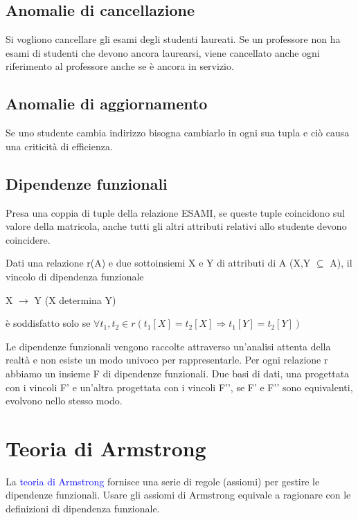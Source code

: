 \subsection{Anomalie di cancellazione}

Si vogliono cancellare gli esami degli studenti laureati. Se un professore non ha esami di studenti che devono ancora laurearsi, viene cancellato anche ogni riferimento al professore anche se è ancora in servizio.

\subsection{Anomalie di aggiornamento}

Se uno studente cambia indirizzo bisogna cambiarlo in ogni sua tupla e ciò causa una criticità di efficienza.

\subsection{Dipendenze funzionali}

Presa una coppia di tuple della relazione ESAMI, se queste tuple coincidono sul valore della matricola, anche tutti gli altri attributi relativi allo studente devono coincidere.

Dati una relazione r(A) e due sottoinsiemi X e Y di attributi di A (X,Y $\subseteq$ A), il vincolo di dipendenza funzionale

\begin{center}
    X $\rightarrow$ Y (X determina Y)
\end{center}

è soddisfatto solo se $\forall t_1, t_2 \in r(t_1[X] = t_2[X] \Rightarrow t_1[Y] = t_2[Y])$

Le dipendenze funzionali vengono raccolte attraverso un’analisi attenta della realtà e non esiste un modo univoco per rappresentarle. Per ogni relazione r abbiamo un insieme F di dipendenze funzionali. Due basi di dati, una progettata con i vincoli F’ e un’altra progettata con i vincoli F’’, se F’ e F’’ sono equivalenti, evolvono nello stesso modo.

\section{Teoria di Armstrong}

La \textcolor{blue}{teoria di Armstrong} fornisce una serie di regole (assiomi) per gestire le dipendenze funzionali. Usare gli assiomi di Armstrong equivale a ragionare con le definizioni di dipendenza funzionale.

